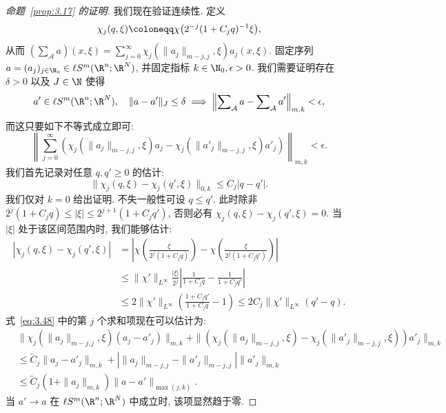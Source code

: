 \begin{proof}[命题~\ref{prop:3.17} 的证明]
我们现在验证连续性. 定义
\begin{equation}\label{eq:3.46}
    \chi_j(q, \xi) \defeq \chi\bigl(2^{-j}(1 + C_j q)^{-1} \xi\bigr),
\end{equation}
从而 $(\sum_{\mathcal{A}} a)(x, \xi) = \sum_{j=0}^\infty \chi_j(\|a_j\|_{m-j, j}, \xi) a_j(x, \xi)$. 固定序列 $a = (a_j)_{j \in \N_0} \in \ell S^m(\R^n; \R^N)$, 并固定指标 $k \in \N_0, \epsilon > 0$. 我们需要证明存在 $\delta > 0$ 以及 $J \in \N$ 使得
\begin{equation}\label{eq:3.47}
    a' \in \ell S^m(\R^n; \R^N), \quad \|a - a'\|_J \le \delta \implies \left\| \sum\nolimits_{\mathcal{A}} a - \sum\nolimits_{\mathcal{A}} a' \right\|_{m, k} < \epsilon,
\end{equation}
而这只要如下不等式成立即可:
\begin{equation}\label{eq:3.48}
    \left\| \sum_{j=0}^\infty \left( \chi_j(\|a_j\|_{m-j, j}, \xi) a_j - \chi_j(\|a'_j\|_{m-j, j}, \xi) a'_j \right) \right\|_{m, k} < \epsilon.
\end{equation}
我们首先记录对任意 $q, q' \ge 0$ 的估计:
\begin{equation}\label{eq:3.49}
    \|\chi_j(q, \xi) - \chi_j(q', \xi)\|_{0, k} \le C_j |q - q'|.
\end{equation}
我们仅对 $k = 0$ 给出证明. 不失一般性可设 $q \le q'$. 此时除非 $2^j(1 + C_j q) \le |\xi| \le 2^{j+1}(1 + C_j q')$, 否则必有 $\chi_j(q, \xi) - \chi_j(q', \xi) = 0$. 当 $|\xi|$ 处于该区间范围内时, 我们能够估计:
\begin{equation}\label{eq:3.50}
    \begin{aligned}
        |\chi_j(q, \xi) - \chi_j(q', \xi)|
        &= \left| \chi\left( \frac{\xi}{2^j(1 + C_j q)} \right) - \chi\left( \frac{\xi}{2^j(1 + C_j q')} \right) \right| \\
        &\le \|\chi'\|_{L^\infty} \frac{|\xi|}{2^j} \left| \frac{1}{1 + C_j q} - \frac{1}{1 + C_j q'} \right| \\
        &\le 2 \|\chi'\|_{L^\infty} \left( \frac{1 + C_j q'}{1 + C_j q} - 1 \right) \le 2 C_j \|\chi'\|_{L^\infty} (q' - q).
    \end{aligned}
\end{equation}
式~\eqref{eq:3.48} 中的第 $j$ 个求和项现在可以估计为:
\begin{equation}\label{eq:3.51}
    \begin{aligned}
        &\|\chi_j(\|a_j\|_{m-j, j}, \xi)(a_j - a'_j)\|_{m, k} + \|(\chi_j(\|a_j\|_{m-j, j}, \xi) - \chi_j(\|a'_j\|_{m-j, j}, \xi)) a'_j\|_{m, k} \\
        &\le \tilde{C}_j \|a_j - a'_j\|_{m, k} + |\|a_j\|_{m-j, j} - \|a'_j\|_{m-j, j}| \|a'_j\|_{m, k} \\
        &\le \tilde{C}_j (1 + \|a_j\|_{m, k}) \|a - a'\|_{\max(j, k)}.
    \end{aligned}
\end{equation}
当 $a' \to a$ 在 $\ell S^m(\R^n; \R^N)$ 中成立时, 该项显然趋于零.


\end{proof}
